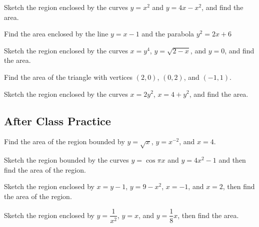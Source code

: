 \documentclass[notes]{subfiles}
\begin{document}
		
		\begin{ex}
			Sketch the region enclosed by the curves \(y = x^2\) and \(y = 4x-x^2\), and find the area.
		\end{ex}	

			\newpage
	
		\begin{ex}
			Find the area enclosed by the line \(y = x-1\) and the parabola \(y^2=2x+6\)
		\end{ex}
			
		\begin{ex}
			Sketch the region enclosed by the curves \(x = y^4\), \(y=\sqrt{2-x}\), and \(y = 0\), and find the area.
		\end{ex}
			\newpage
			
			
		\begin{ex}
			Find the area of the triangle with vertices \((2,0)\), \((0,2)\), and \((-1,1)\).
		\end{ex}	
			
		\begin{ex}
			Sketch the region enclosed by the curves \(x = 2y^2\), \(x = 4+y^2\), and find the area.
		\end{ex}
			\newpage
			
	\subsection*{After Class Practice}
		\begin{ex}
			Find the area of the region bounded by \(y = \sqrt{x}\), \(y = x^{-2}\), and \(x = 4\).
		\end{ex}
			
		\begin{ex}
			Sketch the region bounded by the curves \(y = \cos \pi x\) and \(y = 4x^2 - 1\) and then find the area of the region.
		\end{ex}

		
			\newpage
			
		\begin{ex}
			Sketch the region enclosed by \(x = y - 1\), \(y = 9-x^2\), \(x = -1\), and \(x = 2\), then find the area of the region.
		\end{ex}
			
		\begin{ex}
			Sketch the region enclosed by \(y = \dfrac{1}{x^2}\), \(y = x\), and \(y = \dfrac{1}{8}x\), then find the area.
		\end{ex}
		
	\clearpage
\end{document}
